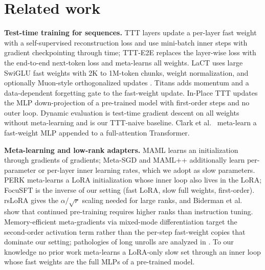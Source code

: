 \documentclass[10pt]{article}
\begin{document}
\section{Related work}
\textbf{Test-time training for sequences.} TTT layers \citep{sun2024ttt} update a per-layer fast weight with a self-supervised reconstruction loss and use mini-batch inner steps with gradient checkpointing through time; TTT-E2E \citep{tandon2025e2e} replaces the layer-wise loss with the end-to-end next-token loss and meta-learns all weights. LaCT \citep{zhang2025lact} uses large SwiGLU fast weights with 2K to 1M-token chunks, weight normalization, and optionally Muon-style orthogonalized updates \citep{liu2025muon}. Titans \citep{behrouz2024titans} adds momentum and a data-dependent forgetting gate to the fast-weight update. In-Place TTT \citep{feng2026inplace} updates the MLP down-projection of a pre-trained model with first-order steps and no outer loop. Dynamic evaluation \citep{krause2018dynamic} is test-time gradient descent on all weights without meta-learning and is our TTT-naive baseline. Clark et al.\ \citep{clark2022fastweight} meta-learn a fast-weight MLP appended to a full-attention Transformer.

\textbf{Meta-learning and low-rank adapters.} MAML \citep{finn2017maml} learns an initialization through gradients of gradients; Meta-SGD \citep{li2017metasgd} and MAML++ \citep{antoniou2019mamlpp} additionally learn per-parameter or per-layer inner learning rates, which we adopt as slow parameters. PERK \citep{chen2025perk} meta-learns a LoRA initialization whose inner loop also lives in the LoRA; FocuSFT \citep{pei2026focusft} is the inverse of our setting (fast LoRA, slow full weights, first-order). rsLoRA \citep{kalajdzievski2023rslora} gives the $\alpha/\sqrt{r}$ scaling needed for large ranks, and Biderman et al.\ \citep{biderman2024lora} show that continued pre-training requires higher ranks than instruction tuning. Memory-efficient meta-gradients via mixed-mode differentiation \citep{kemaev2025mixflow} target the second-order activation term rather than the per-step fast-weight copies that dominate our setting; pathologies of long unrolls are analyzed in \citep{metz2019pathologies}. To our knowledge no prior work meta-learns a LoRA-only slow set through an inner loop whose fast weights are the full MLPs of a pre-trained model.
\end{document}
